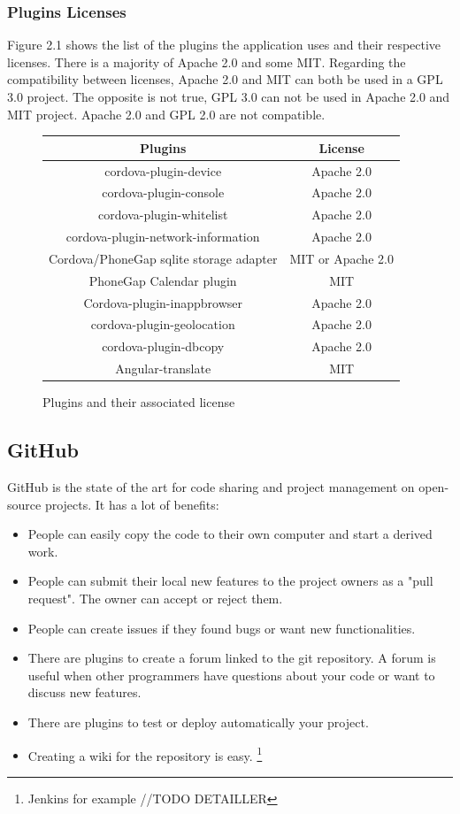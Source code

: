 \documentclass{eplmastersthesis}
\begin{document}
\subsubsection{Plugins Licenses}
Figure 2.1 shows the list of the plugins the application uses and their respective licenses. There is a majority of Apache 2.0 and some MIT. Regarding the compatibility between licenses, Apache 2.0 and MIT can both be used in a GPL 3.0 project. The opposite is not true, GPL 3.0 can not be used in Apache 2.0 and MIT project. Apache 2.0 and GPL 2.0 are not compatible. 

\begin{figure}[H]
\begin{center}
\begin{tabular}{c|c}
Plugins & License\\
\hline
cordova-plugin-device & Apache 2.0\\
cordova-plugin-console & Apache 2.0\\
cordova-plugin-whitelist & Apache 2.0\\
cordova-plugin-network-information & Apache 2.0\\
Cordova/PhoneGap sqlite storage adapter & MIT or Apache 2.0\\
PhoneGap Calendar plugin & MIT\\
Cordova-plugin-inappbrowser & Apache 2.0\\
cordova-plugin-geolocation & Apache 2.0\\
cordova-plugin-dbcopy & Apache 2.0\\
Angular-translate & MIT \\
\end{tabular}
\end{center}
\caption{Plugins and their associated license}
\end{figure}
\subsection{GitHub}
GitHub is the state of the art for code sharing and project management on open-source projects. It has a lot of benefits:
\begin{itemize}
\item People can easily copy the code to their own computer and start a derived work. 
\item People can submit their local new features to the project owners as a "pull request". The owner can accept or reject them.
\item People can create issues if they found bugs or want new functionalities. 
\item There are plugins to create a forum linked to the git repository. A forum is useful when other programmers have questions about your code or want to discuss new features.
\item There are plugins to test or deploy automatically your project.
\item Creating a wiki for the repository is easy.
\footnote{Jenkins for example //TODO DETAILLER}
\end{itemize}
\end{document}
